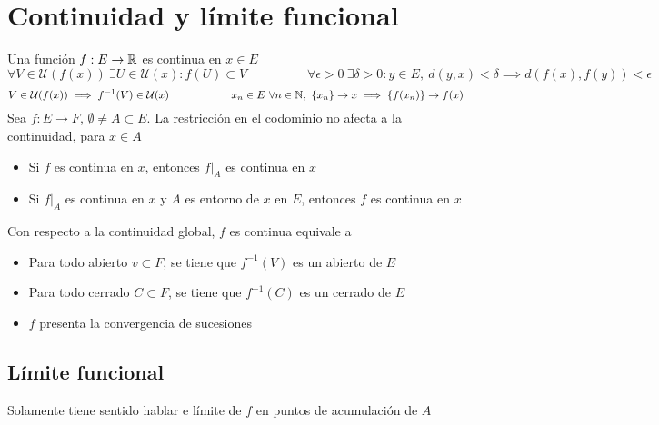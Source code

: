 \section{Continuidad y límite funcional}
Una función $f:E\rightarrow\mathbb{R}$ es continua en $x\in E$
$$ \forall V\in\mathcal{U}(f(x)) \ \exists U\in \mathcal{U}(x) : f(U) \subset V\hspace{2cm}
\forall\epsilon>0 \ \exists\delta>0 : y\in E,\ d(y,x)<\delta \implies d(f(x),f(y))<\epsilon$$
$$V\in\mathcal{U}(f(x)) \implies f^{-1}(V)\in\mathcal{U}(x)  \hspace{2cm}
x_n\in E\ \forall n\in\mathbb{N},\ \{x_n\}\rightarrow x\implies \{f(x_n)\}\rightarrow f(x) $$
Sea $f:E\rightarrow F$, $\emptyset\not = A\subset E$. La restricción en el codominio no afecta a la continuidad, para $x\in A$
\begin{itemize}
	\item Si $f$ es continua en $x$, entonces $f|_A$ es continua en $x$
	\item Si $f|_A$ es continua en $x$ y $A$ es entorno de $x$ en $E$, entonces $f$ es continua en $x$
\end{itemize}
Con respecto a la continuidad global, $f$ es continua equivale a
\begin{itemize}
	\item Para todo abierto $v\subset F$, se tiene que $f^{-1}(V)$ es un abierto de $E$
	\item Para todo cerrado $C\subset F$, se tiene que $f^{-1}(C)$ es un cerrado de $E$
	\item $f$ presenta la convergencia de sucesiones
\end{itemize}

\subsection{Límite funcional}
Solamente tiene sentido hablar e límite de $f$ en puntos de acumulación de $A$